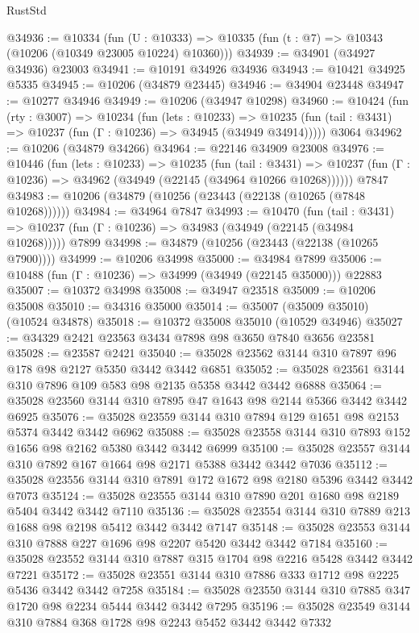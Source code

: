 \begin{lexlean}{RustStd}
\begin{coremodule}
@34936 := @10334
    (fun (U : @10333) => @10335 (fun (t : @7) => @10343 (@10206 (@10349 @23005 @10224) @10360)))
@34939 := @34901 (@34927 @34936) @23003
@34941 := @10191 @34926 @34936
@34943 := @10421 @34925 @5335
@34945 := @10206 (@34879 @23445)
@34946 := @34904 @23448
@34947 := @10277 @34946
@34949 := @10206 (@34947 @10298)
@34960 := @10424
    (fun (rty : @3007) =>
    @10234
      (fun (lets : @10233) =>
      @10235 (fun (tail : @3431) => @10237 (fun (Γ : @10236) => @34945 (@34949 @34914)))))
    @3064
@34962 := @10206 (@34879 @34266)
@34964 := @22146 @34909 @23008
@34976 := @10446
    (fun (lets : @10233) =>
    @10235
      (fun (tail : @3431) =>
      @10237 (fun (Γ : @10236) => @34962 (@34949 (@22145 (@34964 @10266 @10268))))))
    @7847
@34983 := @10206 (@34879 (@10256 (@23443 (@22138 (@10265 (@7848 @10268))))))
@34984 := @34964 @7847
@34993 := @10470
    (fun (tail : @3431) => @10237 (fun (Γ : @10236) => @34983 (@34949 (@22145 (@34984 @10268)))))
    @7899
@34998 := @34879 (@10256 (@23443 (@22138 (@10265 @7900))))
@34999 := @10206 @34998
@35000 := @34984 @7899
@35006 := @10488 (fun (Γ : @10236) => @34999 (@34949 (@22145 @35000))) @22883
@35007 := @10372 @34998
@35008 := @34947 @23518
@35009 := @10206 @35008
@35010 := @34316 @35000
@35014 := @35007 (@35009 @35010) (@10524 @34878)
@35018 := @10372 @35008 @35010 (@10529 @34946)
@35027 := @34329 @2421 @23563 @3434 @7898 @98 @3650 @7840 @3656 @23581
@35028 := @23587 @2421
@35040 := @35028 @23562 @3144 @310 @7897 @96 @178 @98 @2127 @5350 @3442 @3442 @6851
@35052 := @35028 @23561 @3144 @310 @7896 @109 @583 @98 @2135 @5358 @3442 @3442 @6888
@35064 := @35028 @23560 @3144 @310 @7895 @47 @1643 @98 @2144 @5366 @3442 @3442 @6925
@35076 := @35028 @23559 @3144 @310 @7894 @129 @1651 @98 @2153 @5374 @3442 @3442 @6962
@35088 := @35028 @23558 @3144 @310 @7893 @152 @1656 @98 @2162 @5380 @3442 @3442 @6999
@35100 := @35028 @23557 @3144 @310 @7892 @167 @1664 @98 @2171 @5388 @3442 @3442 @7036
@35112 := @35028 @23556 @3144 @310 @7891 @172 @1672 @98 @2180 @5396 @3442 @3442 @7073
@35124 := @35028 @23555 @3144 @310 @7890 @201 @1680 @98 @2189 @5404 @3442 @3442 @7110
@35136 := @35028 @23554 @3144 @310 @7889 @213 @1688 @98 @2198 @5412 @3442 @3442 @7147
@35148 := @35028 @23553 @3144 @310 @7888 @227 @1696 @98 @2207 @5420 @3442 @3442 @7184
@35160 := @35028 @23552 @3144 @310 @7887 @315 @1704 @98 @2216 @5428 @3442 @3442 @7221
@35172 := @35028 @23551 @3144 @310 @7886 @333 @1712 @98 @2225 @5436 @3442 @3442 @7258
@35184 := @35028 @23550 @3144 @310 @7885 @347 @1720 @98 @2234 @5444 @3442 @3442 @7295
@35196 := @35028 @23549 @3144 @310 @7884 @368 @1728 @98 @2243 @5452 @3442 @3442 @7332

\end{coremodule}
\end{lexlean}
